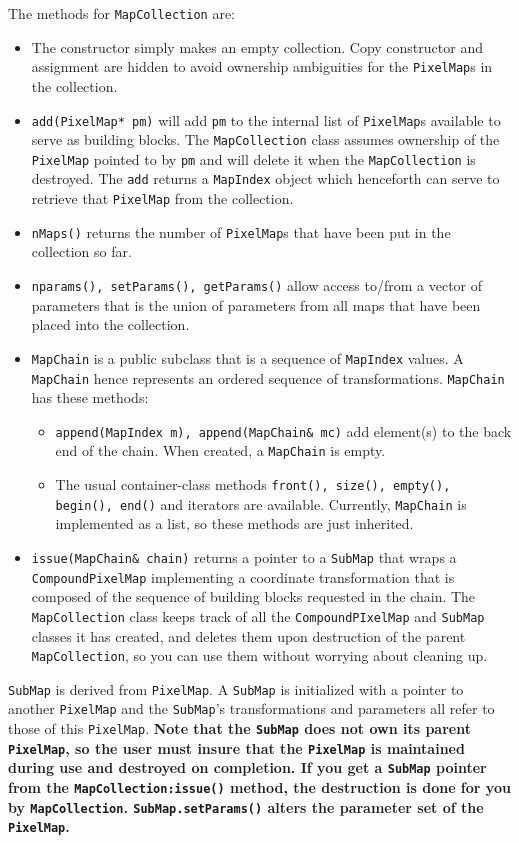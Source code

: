 \documentclass[11pt,preprint,flushrt]{aastex}
\begin{document}
The methods for {\tt MapCollection} are:
\begin{itemize}
\item The constructor simply makes an empty collection.  Copy constructor and assignment are hidden to avoid ownership ambiguities for the {\tt PixelMap}s in the collection.
\item {\tt add(PixelMap* pm)} will add {\tt pm} to the internal list of {\tt PixelMap}s available to serve as building blocks.  The {\tt MapCollection} class assumes ownership of the {\tt PixelMap} pointed to by {\tt pm} and will delete it when the {\tt MapCollection} is destroyed. The {\tt add} returns a {\tt MapIndex} object which henceforth can serve to retrieve that {\tt PixelMap} from the collection.
\item {\tt nMaps()} returns the number of {\tt PixelMap}s that have been put in the collection so far.
\item {\tt nparams(), setParams(), getParams()} allow access to/from a vector of parameters that is the union of parameters from all maps that have been placed into the collection.
\item {\tt MapChain} is a public subclass that is a sequence of {\tt MapIndex} values.  A {\tt MapChain} hence represents an ordered sequence of transformations.  {\tt MapChain} has these methods:
\begin{itemize}
  \item {\tt append(MapIndex m), append(MapChain\& mc)} add element(s) to the back end of the chain.  When created, a {\tt MapChain} is empty.  
\item The usual container-class methods {\tt front(), size(), empty(), begin(), end()} and iterators are available.  Currently, {\tt MapChain} is implemented as a list, so these methods are just inherited.
\end{itemize}
\item {\tt issue(MapChain\& chain)} returns a pointer to a {\tt SubMap} that wraps a {\tt CompoundPixelMap} implementing a coordinate transformation that is composed of the sequence of building blocks requested in the chain.  The {\tt MapCollection} class keeps track of all the {\tt CompoundPIxelMap} and {\tt SubMap} classes it has created, and deletes them upon destruction of the parent {\tt MapCollection}, so you can use them without worrying about cleaning up.
\end{itemize}

{\tt SubMap} is derived from {\tt PixelMap}.
A {\tt SubMap} is initialized with a pointer to another {\tt PixelMap} and the {\tt SubMap}'s transformations and parameters all refer to those of this {\tt PixelMap}.  {\bf Note that the {\tt SubMap} does not own its parent {\tt PixelMap}, so the user must insure that the {\tt PixelMap} is maintained during use and destroyed on completion.  If you get a {\tt SubMap} pointer from the {\tt MapCollection:issue()} method, the destruction is done for you by {\tt MapCollection}.  {\tt SubMap.setParams()} alters the parameter set of the {\tt PixelMap}.}  
\end{document}

